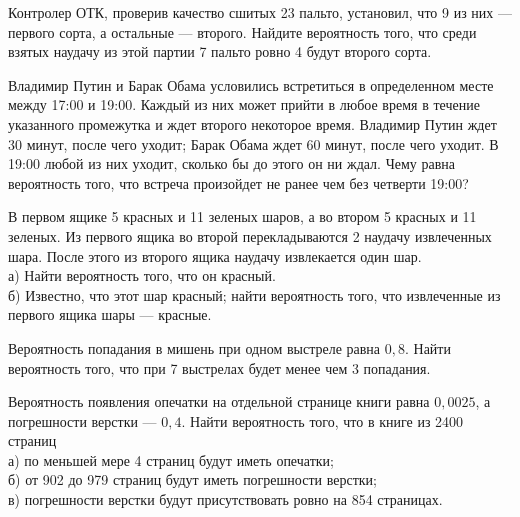 \newpage\setcounter{zad}{0}



\begin{zkrW}{20}\noindent 
	Контролер ОТК, проверив качество сшитых 23 пальто, установил, что 9 из них --- первого сорта, а остальные --- второго. Найдите вероятность того, что среди взятых наудачу из этой партии 7 пальто ровно 4 будут второго сорта.
 
\end{zkrW}

\begin{zkrW}{20}\noindent 
	Владимир Путин и Барак Обама условились встретиться в определенном месте между 17:00 и 19:00. Каждый из них может прийти в любое время в течение указанного промежутка и ждет второго некоторое время. Владимир Путин ждет 30 минут, после чего уходит; Барак Обама ждет 60 минут, после чего уходит. В 19:00 любой из них уходит, сколько бы до этого он ни ждал. Чему равна вероятность того, что встреча произойдет не ранее чем без четверти 19:00?
 
\end{zkrW}

\begin{zkrW}{20}\noindent 
	В первом ящике 5 красных и 11 зеленых шаров, а во втором 5 красных и 11 зеленых. Из первого ящика во второй перекладываются 2 наудачу извлеченных шара. После этого из второго ящика наудачу извлекается один шар. \\ \indent а) Найти вероятность того, что он красный. \\ \indent б) Известно, что этот шар красный; найти вероятность того, что извлеченные из первого ящика шары --- красные.
 
\end{zkrW}

\begin{zkrW}{20}\noindent 
	Вероятность попадания в мишень при одном выстреле равна $0{,}8$. Найти вероятность того, что при 7 выстрелах будет менее чем 3 попадания.
 
\end{zkrW}

\begin{zkrW}{20}\noindent 
	Вероятность появления опечатки на отдельной странице книги равна $0{,}0025$, а погрешности верстки --- $0{,}4$. Найти вероятность того, что в книге из 2400 страниц \\ \indent а) по меньшей мере 4 страниц будут иметь опечатки; \\ \indent б) от 902 до 979 страниц будут иметь погрешности верстки; \\ \indent в) погрешности верстки будут присутствовать ровно на 854 страницах.
 
\end{zkrW}

